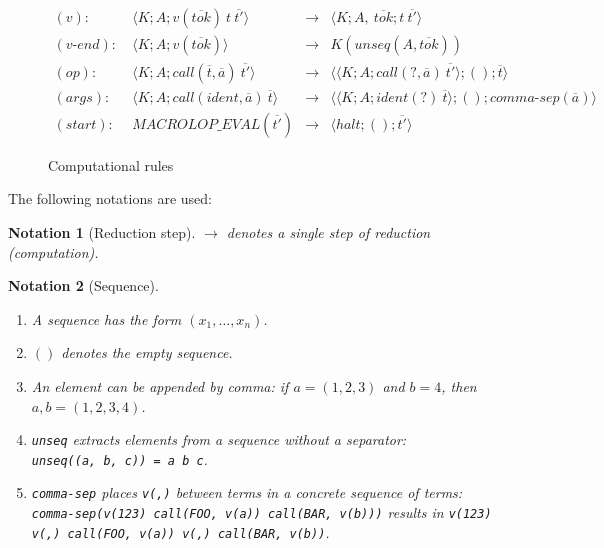 \documentclass[12pt]{article}
\theoremstyle{break}
\newtheorem{notation}{Notation}
\begin{document}
\begin{figure}[H]
    \caption{Computational rules}

    \begin{align*}
        (v): \ & \langle K; A; v(\overline{tok}) \ t \ \overline{t'} \rangle & \to &
            \langle K; A, \ \overline{tok}; t \ \overline{t'} \rangle \\
        (v\mbox{-}end): \ & \langle K; A; v(\overline{tok}) \rangle & \to &
            K(unseq(A, \overline{tok})) \\
        (op): \ & \langle K; A; call(\overline{t}, \overline{a}) \ \overline{t'} \rangle & \to &
            \langle \langle K; A; call(?, \overline{a}) \ \overline{t'} \rangle; (); \overline{t} \rangle \\
        (args): \ & \langle K; A; call(ident, \overline{a}) \ \overline{t} \rangle & \to
            & \langle \langle K; A; ident(?) \ \overline{t} \rangle; (); comma\mbox{-}sep(\overline{a}) \rangle \\
        (start): \ & MACROLOP\_EVAL(\overline{t'}) & \to &
            \langle halt; (); \overline{t'} \rangle
    \end{align*}
\end{figure}

The following notations are used:

\begin{notation}[Reduction step]
    $\to$ denotes a single step of reduction (computation).
\end{notation}

\begin{notation}[Sequence]
    \label{SequencesNotation}
    \begin{enumerate}
        \item A sequence has the form $(x_1, \ldots, x_n)$.
        \item $()$ denotes the empty sequence.
        \item An element can be appended by comma: if $a = (1, 2, 3)$ and $b = 4$, then $a, b = (1, 2, 3, 4)$.
        \item \texttt{unseq} extracts elements from a sequence without a separator: \\
        \texttt{unseq((a, b, c)) = a b c}.
        \item \texttt{comma-sep} places \texttt{v(,)} between terms in a concrete sequence of terms:\\
        \texttt{comma-sep(v(123) call(FOO, v(a)) call(BAR, v(b)))} results in
        \texttt{v(123) v(,) call(FOO, v(a)) v(,) call(BAR, v(b))}.
    \end{enumerate}
\end{notation}
\end{document}
